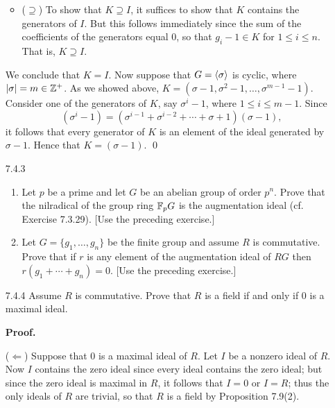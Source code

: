 \begin{enumerate}
\begin{itemize}
         \item ($\supseteq$) To show that $K \supseteq I$, it suffices to show
               that $K$ contains the generators of $I$. But this follows
               immediately since the sum of the coefficients of the generators
               equal 0, so that $g_i - 1 \in K$ for $1 \le i \le n$. That is,
               $K \supseteq I$.
      \end{itemize}
      We conclude that $K = I$. Now suppose that $G = \langle \sigma \rangle$ is cyclic, 
      where $|\sigma| = m \in \mathbb{Z}^+$. As we showed above,
      $K = (\sigma - 1, \sigma^2 - 1, \ldots, \sigma^{m-1} - 1)$. Consider one
      of the generators of $K$, say $\sigma^i - 1$, where $1 \le i \le m - 1$.
      Since
      $$(\sigma^i - 1) = (\sigma^{i-1} + \sigma^{i-2} + \cdots + \sigma + 1)
        (\sigma - 1),$$
      it follows that every generator of $K$ is an element of the ideal
      generated by $\sigma - 1$. Hence that $K = (\sigma - 1)$. \qed
   \item[7.4.3]   \begin{enumerate}
                     \item Let $p$ be a prime and let $G$ be an abelian group of
                           order $p^n$. Prove that the nilradical of the group
                           ring $\mathbb{F}_pG$ is the augmentation ideal
                           (cf. Exercise 7.3.29). [Use the preceding exercise.]
                     \item Let $G = \{g_1, \ldots, g_n\}$ be the finite group
                           and assume $R$ is commutative. Prove that if $r$ is
                           any element of the augmentation ideal of $RG$ then
                           $r(g_1 + \cdots + g_n) = 0$. [Use the preceding
                           exercise.]
                  \end{enumerate}
   \item[7.4.4]   Assume $R$ is commutative. Prove that $R$ is a field if and
                  only if 0 is a maximal ideal.

      \textbf{Proof.}

      ($\Leftarrow$) Suppose that 0 is a maximal ideal of $R$. Let $I$ be a
      nonzero ideal of $R$. Now $I$ contains the zero ideal since every ideal
      contains the zero ideal; but since the zero ideal is maximal in $R$, it
      follows that $I = 0$ or $I = R$; thus the only ideals of $R$ are trivial,
      so that $R$ is a field by Proposition 7.9(2).


\end{enumerate}
